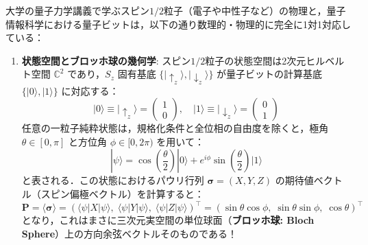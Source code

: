 \documentclass[11pt,a4paper,oneside,openany]{ltjsbook}
\theoremstyle{definition}
\theoremstyle{plain}
\theoremstyle{remark}
\newcommand{\ket}[1]{|#1\rangle}
\newcommand{\mel}[3]{\langle#1|#2|#3\rangle}
\begin{document}
\begin{insightbox}
大学の量子力学講義で学ぶスピン$1/2$粒子（電子や中性子など）の物理と，量子情報科学における量子ビットは，以下の通り数理的・物理的に完全に1対1対応している：

\begin{enumerate}
    \item \textbf{状態空間とブロッホ球の幾何学}:
    スピン$1/2$粒子の状態空間は2次元ヒルベルト空間 $\mathbb{C}^2$ であり，$S_z$ 固有基底 $\{\ket{\uparrow_z}, \ket{\downarrow_z}\}$ が量子ビットの計算基底 $\{\ket{0}, \ket{1}\}$ に対応する：
    \begin{equation}
        \ket{0} \equiv \ket{\uparrow_z} = \begin{pmatrix} 1 \\ 0 \end{pmatrix}, \quad \ket{1} \equiv \ket{\downarrow_z} = \begin{pmatrix} 0 \\ 1 \end{pmatrix}
    \end{equation}
    任意の一粒子純粋状態は，規格化条件と全位相の自由度を除くと，極角 $\theta \in [0, \pi]$ と方位角 $\phi \in [0, 2\pi)$ を用いて：
    \begin{equation}
        \ket{\psi} = \cos\left(\frac{\theta}{2}\right)\ket{0} + e^{i\phi}\sin\left(\frac{\theta}{2}\right)\ket{1}
    \end{equation}
    と表される．この状態におけるパウリ行列 $\bm{\sigma} = (X, Y, Z)$ の期待値ベクトル（スピン偏極ベクトル）を計算すると：
    \begin{equation}
        \bm{P} = \langle \bm{\sigma} \rangle = (\mel{\psi}{X}{\psi}, \; \mel{\psi}{Y}{\psi}, \; \mel{\psi}{Z}{\psi})^\top = (\sin\theta \cos\phi, \; \sin\theta \sin\phi, \; \cos\theta)^\top
    \end{equation}
    となり，これはまさに三次元実空間の単位球面（\textbf{ブロッホ球: Bloch Sphere}）上の方向余弦ベクトルそのものである！


\end{enumerate}
\end{insightbox}
\end{document}

